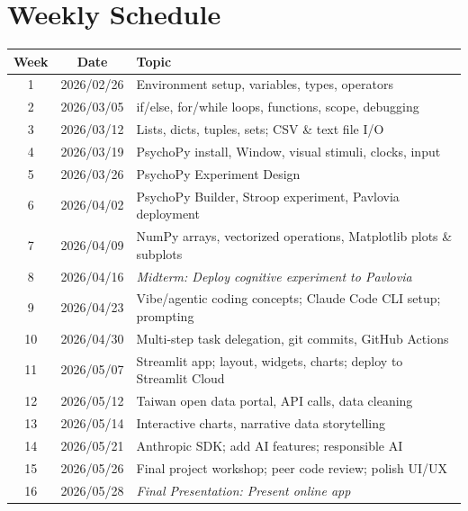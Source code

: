 \section{Weekly Schedule}
\begin{longtable}{c c p{10cm}}
\toprule
\textbf{Week} & \textbf{Date} & \textbf{Topic} \\
\midrule
\rowcolor{mod1} 1 & 2026/02/26 & Environment setup, variables, types, operators \\
\rowcolor{mod1} 2 & 2026/03/05 & if/else, for/while loops, functions, scope, debugging \\
\rowcolor{mod1} 3 & 2026/03/12 & Lists, dicts, tuples, sets; CSV \& text file I/O \\
\rowcolor{mod1} 4 & 2026/03/19 & PsychoPy install, Window, visual stimuli, clocks, input \\
\rowcolor{mod1} 5 & 2026/03/26 & PsychoPy Experiment Design \\
\rowcolor{mod1} 6 & 2026/04/02 & PsychoPy Builder, Stroop experiment, Pavlovia deployment \\
\rowcolor{mod1} 7 & 2026/04/09 & NumPy arrays, vectorized operations, Matplotlib plots \& subplots \\
\rowcolor{mod1} 8 & 2026/04/16 & \textit{Midterm: Deploy cognitive experiment to Pavlovia} \\
\rowcolor{mod3} 9 & 2026/04/23 & Vibe/agentic coding concepts; Claude Code CLI setup; prompting \\ 
\rowcolor{mod3} 10 & 2026/04/30 & Multi-step task delegation, git commits, GitHub Actions \\
\rowcolor{mod3} 11 & 2026/05/07 & Streamlit app; layout, widgets, charts; deploy to Streamlit Cloud \\
\rowcolor{mod3} 12 & 2026/05/12 & Taiwan open data portal, API calls, data cleaning \\
\rowcolor{mod3} 13 & 2026/05/14 & Interactive charts, narrative data storytelling \\
\rowcolor{mod3} 14 & 2026/05/21 & Anthropic SDK; add AI features; responsible AI \\
\rowcolor{mod3} 15 & 2026/05/26 & Final project workshop; peer code review; polish UI/UX \\
\rowcolor{mod3} 16 & 2026/05/28 & \textit{Final Presentation: Present online app} \\
\bottomrule
\end{longtable}
